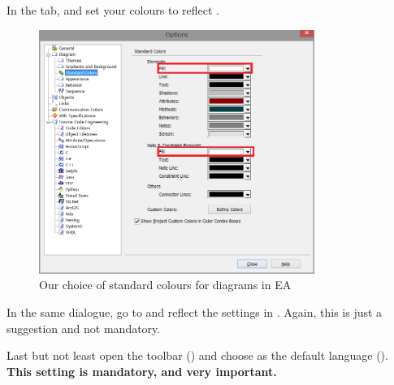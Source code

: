 \begin{stepbystep}
\item  In the  tab, and set your colours to reflect .

\begin{figure}[htbp]
  \centering
  \includegraphics[width=0.8\textwidth]{../../org.moflon.doc.handbook.01_installation/4_projectSetup/modelingWithEA/ea_images/standardColours}
  \caption{Our choice of standard colours for diagrams in EA}
  \label{ea:standardColoursEA}
\end{figure}

\vspace{0.5cm}

\item 
In the same dialogue, go to  and reflect the settings in .
Again, this is just a suggestion and not mandatory.

\item 
Last but not least open the  toolbar () and choose  as the default language ().
\textbf{This setting is mandatory, and very important.}
\end{stepbystep}

